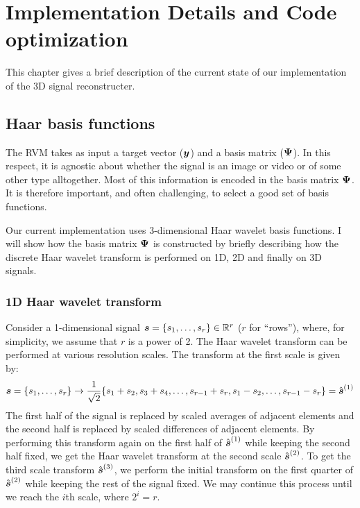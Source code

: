 \chapter{Implementation Details and Code optimization}
This chapter gives a brief description of the current state of our implementation of the 3D signal reconstructer.

\section{Haar basis functions}
The RVM takes as input a target vector ($\boldsymbol y$) and a basis matrix ($\boldsymbol \Psi$). 
In this respect, it is agnostic about whether the signal is an image or video or of some other type alltogether.
Most of this information is encoded in the basis matrix $\boldsymbol \Psi$.
It is therefore important, and often challenging, to select a good set of basis functions.

Our current implementation uses 3-dimensional Haar wavelet basis functions.
I will show how the basis matrix $\boldsymbol\Psi$ is constructed by briefly describing how the discrete Haar wavelet transform is performed on 1D, 2D and finally on 3D signals.

\subsection{1D Haar wavelet transform}
Consider a 1-dimensional signal $\boldsymbol s = \{s_1,\dots,s_r\} \in \mathbb{R}^r$ ($r$ for ``rows''), where, for simplicity, we assume that $r$ is a power of 2.
The Haar wavelet transform can be performed at various resolution scales.
The transform at the first scale is given by:
\begin{equation*}
\boldsymbol s = \{s_1,\dots,s_r\}\to \frac{1}{\sqrt{2}}\{s_1+s_2,s_3+s_4,\dots,s_{r-1}+s_r,s_1-s_2,\dots,s_{r-1}-s_r\}=\hat{\boldsymbol s}^{(1)}
\end{equation*}
The first half of the signal is replaced by scaled averages of adjacent elements and the second half is replaced by scaled differences of adjacent elements.
By performing this transform again on the first half of $\hat{\boldsymbol s}^{(1)}$ while keeping the second half fixed, we get the Haar wavelet transform at the second scale $\hat{\boldsymbol s}^{(2)}$. 
To get the third scale transform $\hat{\boldsymbol s}^{(3)}$, we perform the initial transform on the first quarter of $\hat{\boldsymbol s}^{(2)}$ while keeping the rest of the signal fixed.
We may continue this process until we reach the $i$th scale, where $2^i = r$.

